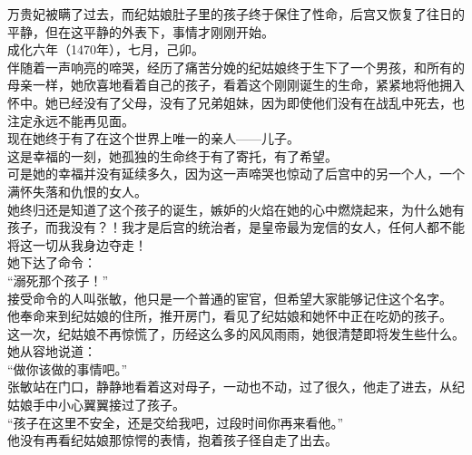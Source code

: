 \begin{multicols}{\theparacolNo}
万贵妃被瞒了过去，而纪姑娘肚子里的孩子终于保住了性命，后宫又恢复了往日的平静，但在这平静的外表下，事情才刚刚开始。\\

成化六年（1470年），七月，己卯。\\

伴随着一声响亮的啼哭，经历了痛苦分娩的纪姑娘终于生下了一个男孩，和所有的母亲一样，她欣喜地看着自己的孩子，看着这个刚刚诞生的生命，紧紧地将他拥入怀中。她已经没有了父母，没有了兄弟姐妹，因为即使他们没有在战乱中死去，也注定永远不能再见面。\\

现在她终于有了在这个世界上唯一的亲人——儿子。\\

这是幸福的一刻，她孤独的生命终于有了寄托，有了希望。\\

可是她的幸福并没有延续多久，因为这一声啼哭也惊动了后宫中的另一个人，一个满怀失落和仇恨的女人。\\

她终归还是知道了这个孩子的诞生，嫉妒的火焰在她的心中燃烧起来，为什么她有孩子，而我没有？！我才是后宫的统治者，是皇帝最为宠信的女人，任何人都不能将这一切从我身边夺走！\\

她下达了命令：\\

“溺死那个孩子！”\\

接受命令的人叫张敏，他只是一个普通的宦官，但希望大家能够记住这个名字。\\

他奉命来到纪姑娘的住所，推开房门，看见了纪姑娘和她怀中正在吃奶的孩子。\\

这一次，纪姑娘不再惊慌了，历经这么多的风风雨雨，她很清楚即将发生些什么。\\

她从容地说道：\\

“做你该做的事情吧。”\\

张敏站在门口，静静地看着这对母子，一动也不动，过了很久，他走了进去，从纪姑娘手中小心翼翼接过了孩子。\\

“孩子在这里不安全，还是交给我吧，过段时间你再来看他。”\\

他没有再看纪姑娘那惊愕的表情，抱着孩子径自走了出去。\\


\end{multicols}
